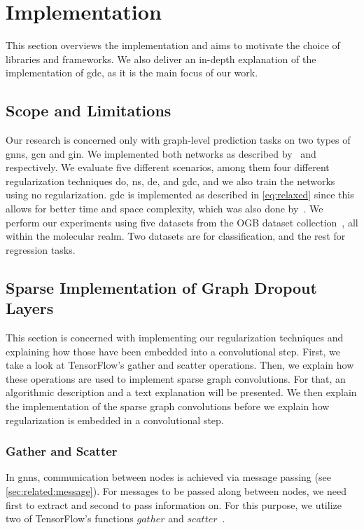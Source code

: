 \chapter{Implementation}
\label{sec:implement}
This section overviews the implementation and aims to motivate the choice of libraries and frameworks.
We also deliver an in-depth explanation of the implementation of \ac{gdc}, as it is the main focus of our work.
\section{Scope and Limitations}
\label{sec:implement:scope}
Our research is concerned only with graph-level prediction tasks on two types of \acp{gnn}, \ac{gcn} and \ac{gin}.
We implemented both networks as described by~\citet{Kipf2017} and~\citet{Xu2019} respectively.
We evaluate five different scenarios, among them four different regularization techniques \ac{do}, \ac{ns}, \ac{de}, and \ac{gdc}, and we also train the networks using no regularization.
\Ac{gdc} is implemented as described in \cref{eq:relaxed} since this allows for better time and space complexity, which was also done by~\citet{Hasanzadeh2020}.
We perform our experiments using five datasets from the OGB dataset collection~\cite{Hu2020}, all within the molecular realm.
Two datasets are for classification, and the rest for regression tasks.

\section{Sparse Implementation of Graph Dropout Layers}

This section is concerned with implementing our regularization techniques and explaining how those have been embedded into a convolutional step. First, we take a look at TensorFlow's gather and scatter operations.
Then, we explain how these operations are used to implement sparse graph convolutions.
For that, an algorithmic description and a text explanation will be presented. We then explain the implementation of the sparse graph convolutions before we explain how regularization is embedded in a convolutional step.
\label{sec:implement:gnndropout}
\subsection{Gather and Scatter}
\label{sec:implement:gnndropout:gatherscatter}
In \acp{gnn}, communication between nodes is achieved via message passing (see \cref{sec:related:message}).
For messages to be passed along between nodes, we need first to extract and second to pass information on.
For this purpose, we utilize two of TensorFlow's functions $\mathit{gather}$ and $\mathit{scatter}$~\cite{He2007,Damke2020}.

